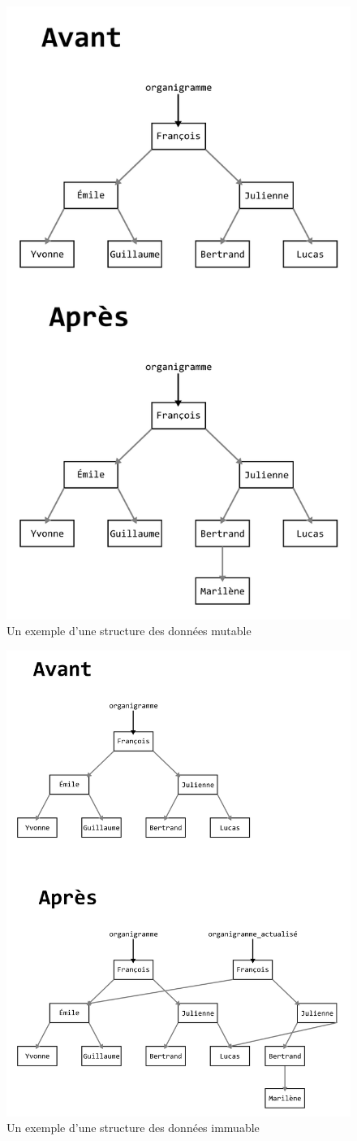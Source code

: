 \documentclass[french]{report}
\begin{document}
\begin{figure}[h]
	\centering
	\includegraphics[width=0.7\linewidth]{mutable_tree}
	\caption{Un exemple d'une structure des données mutable}
	\label{fig:mutable-tree}
\end{figure}

\begin{figure}[h]
	\centering
	\includegraphics[width=0.7\linewidth]{immutable_tree}
	\caption{Un exemple d'une structure des données immuable}
	\label{fig:immutable-tree}
\end{figure}
\end{document}
